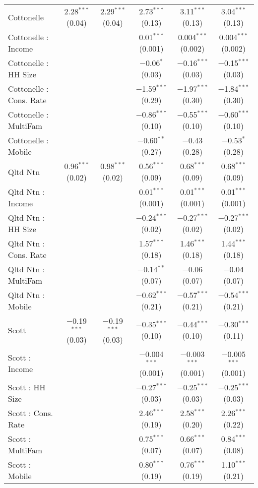 \begin{table}[!htbp]
\begin{tabular}{@{\extracolsep{5pt}}lccccc}
  Cottonelle & 2.28$^{***}$ (0.04) & 2.29$^{***}$ (0.04) & 2.73$^{***}$ (0.13) & 3.11$^{***}$ (0.13) & 3.04$^{***}$ (0.13) \\ 
  Cottonelle : Income &  &  & 0.01$^{***}$ (0.001) & 0.004$^{***}$ (0.002) & 0.004$^{***}$ (0.002) \\ 
  Cottonelle : HH Size &  &  & $-$0.06$^{*}$ (0.03) & $-$0.16$^{***}$ (0.03) & $-$0.15$^{***}$ (0.03) \\ 
  Cottonelle : Cons. Rate &  &  & $-$1.59$^{***}$ (0.29) & $-$1.97$^{***}$ (0.30) & $-$1.84$^{***}$ (0.30) \\ 
  Cottonelle : MultiFam &  &  & $-$0.86$^{***}$ (0.10) & $-$0.55$^{***}$ (0.10) & $-$0.60$^{***}$ (0.10) \\ 
  Cottonelle : Mobile &  &  & $-$0.60$^{**}$ (0.27) & $-$0.43 (0.28) & $-$0.53$^{*}$ (0.28) \\ 
  Qltd Ntn & 0.96$^{***}$ (0.02) & 0.98$^{***}$ (0.02) & 0.56$^{***}$ (0.09) & 0.68$^{***}$ (0.09) & 0.68$^{***}$ (0.09) \\ 
  Qltd Ntn : Income &  &  & 0.01$^{***}$ (0.001) & 0.01$^{***}$ (0.001) & 0.01$^{***}$ (0.001) \\ 
  Qltd Ntn : HH Size &  &  & $-$0.24$^{***}$ (0.02) & $-$0.27$^{***}$ (0.02) & $-$0.27$^{***}$ (0.02) \\ 
  Qltd Ntn : Cons. Rate &  &  & 1.57$^{***}$ (0.18) & 1.46$^{***}$ (0.18) & 1.44$^{***}$ (0.18) \\ 
  Qltd Ntn : MultiFam &  &  & $-$0.14$^{**}$ (0.07) & $-$0.06 (0.07) & $-$0.04 (0.07) \\ 
  Qltd Ntn : Mobile &  &  & $-$0.62$^{***}$ (0.21) & $-$0.57$^{***}$ (0.21) & $-$0.54$^{***}$ (0.21) \\ 
  Scott & $-$0.19$^{***}$ (0.03) & $-$0.19$^{***}$ (0.03) & $-$0.35$^{***}$ (0.10) & $-$0.44$^{***}$ (0.10) & $-$0.30$^{***}$ (0.11) \\ 
  Scott : Income &  &  & $-$0.004$^{***}$ (0.001) & $-$0.003$^{***}$ (0.001) & $-$0.005$^{***}$ (0.001) \\ 
  Scott : HH Size &  &  & $-$0.27$^{***}$ (0.03) & $-$0.25$^{***}$ (0.03) & $-$0.25$^{***}$ (0.03) \\ 
  Scott : Cons. Rate &  &  & 2.46$^{***}$ (0.19) & 2.58$^{***}$ (0.20) & 2.26$^{***}$ (0.22) \\ 
  Scott : MultiFam &  &  & 0.75$^{***}$ (0.07) & 0.66$^{***}$ (0.07) & 0.84$^{***}$ (0.08) \\ 
  Scott : Mobile &  &  & 0.80$^{***}$ (0.19) & 0.76$^{***}$ (0.19) & 1.10$^{***}$ (0.21) \\ 

\end{tabular}
\end{table}
